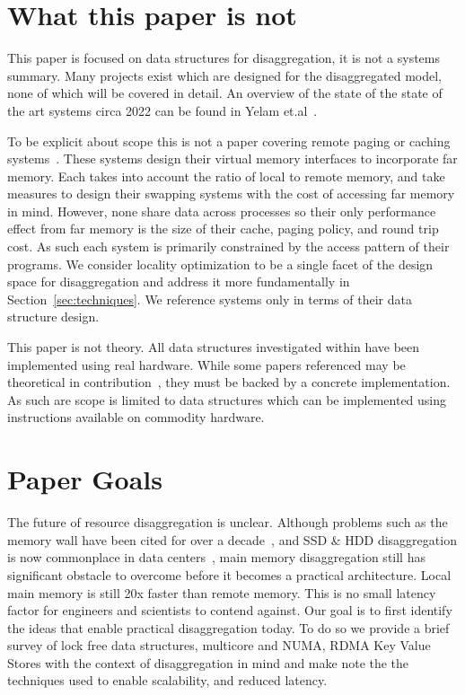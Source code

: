 \section{What this paper is not}
\label{sec:not}

This paper is focused on data structures for disaggregation, it is not a systems
summary.  Many projects exist which are designed for the disaggregated model,
none of which will be covered in detail. An overview of the state of the state
of the art systems circa 2022 can be found in Yelam
et.al~\cite{yelam2022systems}.

To be explicit about scope this is not a paper covering remote paging or caching
systems~\cite{fastswap,kona,infiniswap,leap,legoos}. These systems design their
virtual memory interfaces to incorporate far memory. Each takes into account the
ratio of local to remote memory, and take measures to design their swapping
systems with the cost of accessing far memory in mind.  However, none share data
across processes so their only performance effect from far memory is the size of
their cache, paging policy, and round trip cost. As such each system is
primarily constrained by the access pattern of their programs. We consider
locality optimization to be a single facet of the design space for
disaggregation and address it more fundamentally in
Section~\ref{sec:techniques}. We reference systems only in terms of their data
structure design.

This paper is not theory. All data structures investigated within have been
implemented using real hardware. While some papers referenced may be theoretical
in contribution~\cite{flat-combine,hopscotch,linked-list-cas}, they must be
backed by a concrete implementation. As such are scope is limited to data
structures which can be implemented using instructions available on commodity
hardware.

\section{Paper Goals}

The future of resource disaggregation is unclear. Although problems such as the
memory wall have been cited for over a decade~\cite{blade-server}, and SSD \&
HDD disaggregation is now commonplace in data centers~\cite{decible}, main
memory disaggregation still has significant obstacle to overcome before it
becomes a practical architecture.  Local main memory is still 20x faster than
remote memory. This is no small latency factor for engineers and scientists to
contend against. Our goal is to first identify the ideas that enable practical
disaggregation today. To do so we provide a brief survey of lock free data
structures, multicore and NUMA, RDMA Key Value Stores with the context of
disaggregation in mind and make note the the techniques used to enable
scalability, and reduced latency.

